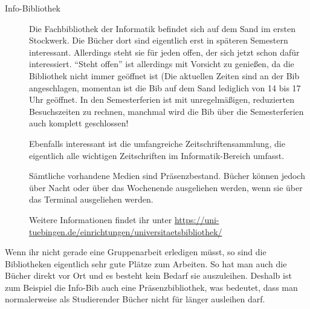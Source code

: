 \begin{description}
	\item[Info-Bibliothek]
	Die Fachbibliothek der Informatik befindet sich auf dem Sand
	im ersten Stockwerk.  Die Bücher dort sind eigentlich erst in
	späteren Semestern interessant.  Aller\-dings steht sie für jeden
	offen, der sich jetzt schon dafür interessiert.  "`Steht
	offen"' ist allerdings mit Vorsicht zu genießen, da die
	Bibliothek nicht immer geöffnet ist (Die aktuellen Zeiten
	sind an der Bib angeschlagen, %
	momentan ist die Bib auf dem Sand lediglich von 14 bis 17 Uhr geöffnet.
	In den Semesterferien ist mit unregelmäßigen, reduzierten Besuchszeiten zu rechnen, manchmal wird die Bib über die Semesterferien auch komplett geschlossen!
	
	Ebenfalls interessant ist die umfangreiche Zeitschriftensammlung,
	die eigentlich alle wichtigen Zeitschriften im
	Informatik-Bereich umfasst.
	
	Sämtliche vorhandene Medien sind Präsenzbestand. Bücher können
	jedoch über Nacht oder über das Wochenende ausgeliehen werden, wenn sie über das Terminal ausgeliehen werden.
	
	Weitere Informationen findet ihr unter \url{https://uni-tuebingen.de/einrichtungen/universitaetsbibliothek/}	%
	
\end{description}

Wenn ihr nicht gerade eine Gruppenarbeit erledigen müsst, so sind die
Bibliotheken eigentlich sehr gute Plätze zum Arbeiten.  So hat man
auch die Bücher direkt vor Ort und es besteht kein Bedarf sie
auszuleihen.  Deshalb ist zum Beispiel die Info-Bib auch eine
Präsenzbibliothek, was bedeutet, dass man normalerweise als
Studierender Bücher nicht für länger ausleihen darf.

